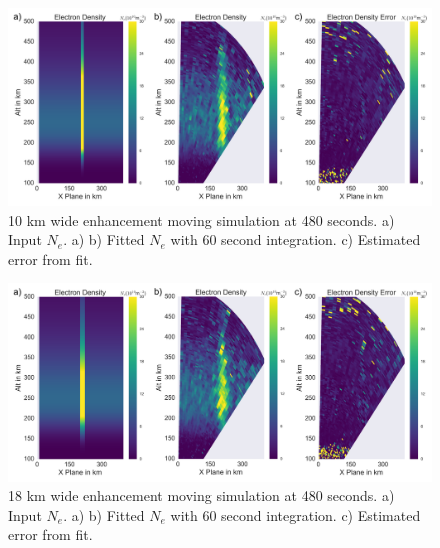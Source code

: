 \documentclass[draft,ras]{agutex}
\begin{document}
\begin{article}
\begin{figure}[!t]
\centering
\includegraphics[width=6in]{moving10kminouterr}
\caption{10 km wide enhancement moving simulation at 480 seconds. a) Input $N_e$. a)  b) Fitted $N_e$ with 60 second integration. c) Estimated error from fit.}
\label{fig:moving10all}
\end{figure}

\begin{figure}[!t]
\centering
\includegraphics[width=6in]{moving18kminouterr}
\caption{18 km wide enhancement moving simulation at 480 seconds. a) Input $N_e$. a)  b) Fitted $N_e$ with 60 second integration. c) Estimated error from fit.}
\label{fig:moving18all}
\end{figure}


\end{article}
\end{document}
